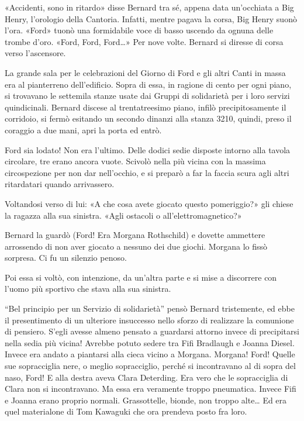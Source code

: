 \documentclass[
a5paper, %
10pt, %
twoside, 
onecolumn, %
openany, %
]{memoir}
\begin{document}
«Accidenti, sono in ritardo» disse Bernard tra sé, appena data un’occhiata a Big Henry, l’orologio della Cantoria. Infatti, mentre pagava la corsa, Big Henry suonò l’ora. «Ford» tuonò una formidabile voce di basso uscendo da ognuna delle trombe d’oro. «Ford, Ford, Ford…» Per nove volte. Bernard si diresse di corsa verso l’ascensore.

La grande sala per le celebrazioni del Giorno di Ford e gli altri Canti in massa era al pianterreno dell’edificio. Sopra di essa, in ragione di cento per ogni piano, si trovavano le settemila stanze usate dai Gruppi di solidarietà per i loro servizi quindicinali. Bernard discese al trentatreesimo piano, infilò precipitosamente il corridoio, si fermò esitando un secondo dinanzi alla stanza 3210, quindi, preso il coraggio a due mani, apri la porta ed entrò.

Ford sia lodato! Non era l’ultimo. Delle dodici sedie disposte intorno alla tavola circolare, tre erano ancora vuote. Scivolò nella più vicina con la massima circospezione per non dar nell’occhio, e si preparò a far la faccia scura agli altri ritardatari quando arrivassero.

Voltandosi verso di lui: «A che cosa avete giocato questo pomeriggio?» gli chiese la ragazza alla sua sinistra. «Agli ostacoli o all’elettromagnetico?»

Bernard la guardò (Ford! Era Morgana Rothschild) e dovette ammettere arrossendo di non aver giocato a nessuno dei due giochi. Morgana lo fissò sorpresa. Ci fu un silenzio penoso.

Poi essa si voltò, con intenzione, da un’altra parte e si mise a discorrere con l’uomo più sportivo che stava alla sua sinistra.

“Bel principio per un Servizio di solidarietà” pensò Bernard tristemente, ed ebbe il presentimento di un ulteriore insuccesso nello sforzo di realizzare la comunione di pensiero. S’egli avesse almeno pensato a guardarsi attorno invece di precipitarsi nella sedia più vicina! Avrebbe potuto sedere tra Fifi Bradlaugh e Joanna Diesel. Invece era andato a piantarsi alla cieca vicino a Morgana. Morgana! Ford! Quelle sue sopracciglia nere, o meglio sopracciglio, perché si incontravano al di sopra del naso, Ford! E alla destra aveva Clara Deterding. Era vero che le sopracciglia di Clara non si incontravano. Ma essa era veramente troppo pneumatica. Invece Fifi e Joanna erano proprio normali. Grassottelle, bionde, non troppo alte… Ed era quel materialone di Tom Kawaguki che ora prendeva posto fra loro.
\end{document}
